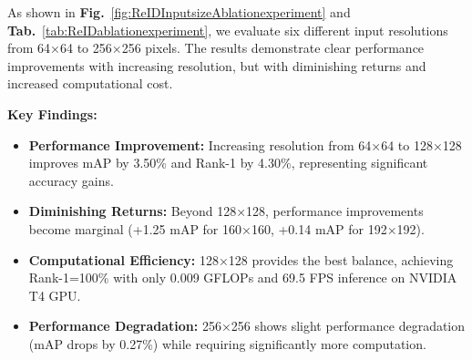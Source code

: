 As shown in \textbf{Fig.}~\ref{fig:ReIDInputsizeAblationexperiment} and \textbf{Tab.}~\ref{tab:ReIDablationexperiment}, we evaluate six different input resolutions from 64×64 to 256×256 pixels. The results demonstrate clear performance improvements with increasing resolution, but with diminishing returns and increased computational cost.

\begin{table}[h]
    \centering
    \caption{ReID Ablation Experiment Results}
    \label{tab:ReIDablationexperiment}
\end{table}

\textbf{Key Findings:}
\begin{itemize}
    \item \textbf{Performance Improvement:} Increasing resolution from 64×64 to 128×128 improves mAP by 3.50\% and Rank-1 by 4.30\%, representing significant accuracy gains.
    \item \textbf{Diminishing Returns:} Beyond 128×128, performance improvements become marginal (+1.25 mAP for 160×160, +0.14 mAP for 192×192).
    \item \textbf{Computational Efficiency:} 128×128 provides the best balance, achieving Rank-1=100\% with only 0.009 GFLOPs and 69.5 FPS inference on NVIDIA T4 GPU.
    \item \textbf{Performance Degradation:} 256×256 shows slight performance degradation (mAP drops by 0.27\%) while requiring significantly more computation.
\end{itemize}

